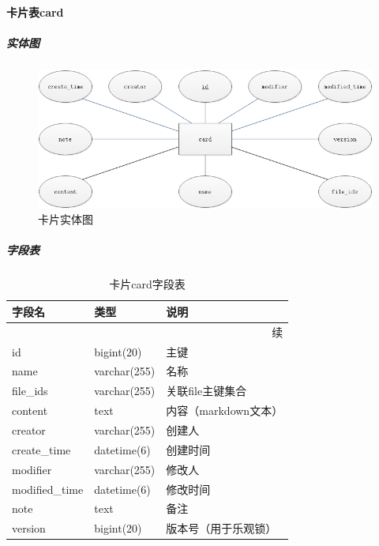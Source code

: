 \documentclass[titlepage,UTF8,linespread=1.5]{ctexart}
\begin{document}
\paragraph{卡片表card}
\subparagraph{实体图}
\begin{figure}[H]
    \centering
    \includegraphics[width=140mm]{entity-card.png}
    \caption{卡片实体图}
    \label{fig:entity-card}
\end{figure}
\subparagraph{字段表}
\begin{longtable}{|p{10em}|p{6em}|p{15em}|}
    \caption{卡片card字段表}\label{tab:table_card}       \\\hline
    字段名         & 类型         & 说明                 \\\hline
    \endfirsthead
    \multicolumn{3}{r}{{续\tablename\thetable{}}}        \\\hline
    \endhead
    id             & bigint(20)   & 主键                 \\\hline
    name           & varchar(255) & 名称                 \\\hline
    file\_ids      & varchar(255) & 关联file主键集合     \\\hline
    content        & text         & 内容（markdown文本） \\\hline
    creator        & varchar(255) & 创建人               \\\hline
    create\_time   & datetime(6)  & 创建时间             \\\hline
    modifier       & varchar(255) & 修改人               \\\hline
    modified\_time & datetime(6)  & 修改时间             \\\hline
    note           & text         & 备注                 \\\hline
    version        & bigint(20)   & 版本号（用于乐观锁） \\\hline
\end{longtable}\par
\end{document}
